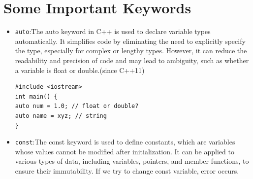 \documentclass[12pt]{article}
\begin{document}
\section{Some Important Keywords}
\begin{itemize}
    \item \texttt{auto}:The auto keyword in C++ is used to declare variable types automatically. It simplifies code by eliminating the need to explicitly specify the type, especially for complex or lengthy types. However, it can reduce the readability and precision of code and may lead to ambiguity, such as whether a variable is float or double.(since C++11)
    \begin{lstlisting}
#include <iostream>
int main() {
auto num = 1.0; // float or double?
auto name = xyz; // string
}
    \end{lstlisting}
    
    \item \texttt{const}:The const keyword is used to define constants, which are variables whose values cannot be modified after initialization. It can be applied to various types of data, including variables, pointers, and member functions, to ensure their immutability. If we try to change const variable, error occurs.
    

\end{itemize}
\end{document}
